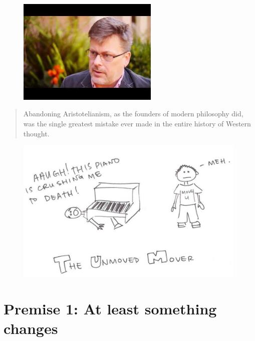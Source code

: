\documentclass[xcolor=dvipsnames]{beamer}
\begin{document}
\begin{frame}{}
  \begin{figure}
  \centering
  \includegraphics[width=0.6\textwidth]{ed-feser}
\end{figure}
  \begin{quote}
    Abandoning Aristotelianism, as the founders of modern philosophy did, was the single greatest mistake ever made in the entire history of Western thought.
  \end{quote}
      \hspace*{8cm}{Edward Feser}
\end{frame}

\begin{frame}{}
\begin{figure}
  \centering
  \includegraphics[width=0.99\textwidth]{unmoved_mover}
\end{figure}
\end{frame}


\section{Premise 1: At least something changes}
\end{document}
